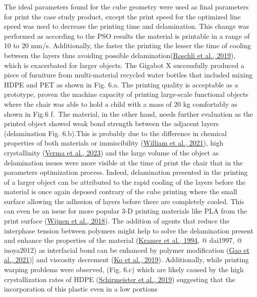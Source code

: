 \documentclass[
  12pt,
  number,
  review]{elsarticle}
\begin{document}
The ideal parameters found for the cube geometry were used as final
parameters for print the case study product, except the print speed for
the optimized line speed was used to decrease the printing time and
delamination. This change was performed as according to the PSO results
the material is printable in a range of 10 to 20 mm/s. Additionally, the
faster the printing the lesser the time of cooling between the layers
thus avoiding possible
delamination(\protect\hyperlink{ref-roschli2019}{Roschli et al., 2019}),
which is exacerbated for larger objects. The Gigabot X successfully
produced a piece of furniture from multi-material recycled water bottles
that included mixing HDPE and PET as shown in Fig. 6.a. The printing
quality is acceptable as a prototype, proven the machine capacity of
printing large-scale functional objects where the chair was able to hold
a child with a mass of 20 kg comfortably as shown in Fig.6 f.~The
material, in the other hand, needs further evaluation as the printed
object showed weak bond strength between the adjacent layers
(delamination Fig. 6.b).This is probably due to the difference in
chemical properties of both materials or immiscibility
(\protect\hyperlink{ref-william2021}{William et al., 2021}), high
crystallinity (\protect\hyperlink{ref-verma2023}{Verma et al., 2023})
and the large volume of the object as delamination issues were more
visible at the time of print the chair that in the parameters
optimization process. Indeed, delamination presented in the printing of
a larger object can be attributed to the rapid cooling of the layers
before the material is once again deposed contrary of the cube printing
where the small surface allowing the adhesion of layers before there are
completely cooled. This can even be an issue for more popular 3-D
printing materials like PLA from the print surface
(\protect\hyperlink{ref-wijnen2018}{Wijnen et al., 2018}). The addition
of agents that reduce the interphase tension between polymers might help
to solve the delamination present and enhance the properties of the
material (\protect\hyperlink{ref-kramer1994}{Kramer et al., 1994}, @
dai1997, @ inoya2012) as interfacial bond can be enhanced by polymer
modification (\protect\hyperlink{ref-gao2021}{Gao et al., 2021}){]} and
viscosity decrement (\protect\hyperlink{ref-ko2019}{Ko et al., 2019}).
Additionally, while printing warping problems were observed, (Fig. 6.c)
which are likely caused by the high crystallization rates of HDPE
(\protect\hyperlink{ref-schirmeister2019}{Schirmeister et al., 2019})
suggesting that the incorporation of this plastic even in a low portions
\end{document}
